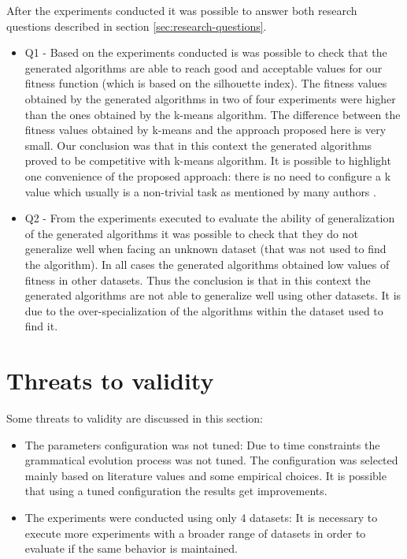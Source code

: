 \documentclass[journal]{IEEEtran}
\begin{document}
After the experiments conducted it was possible to answer both research questions described in section \ref{sec:research-questions}.
\begin{itemize}
	\item Q1 - Based on the experiments conducted is was possible to check that the generated algorithms are able to reach good and acceptable values for our fitness function (which is based on the silhouette index). The fitness values obtained by the generated algorithms in two of four experiments were higher than the ones obtained by the k-means algorithm. The difference between the fitness values obtained by k-means and the approach proposed here is very small. Our conclusion was that in this context the generated algorithms proved to be competitive with k-means algorithm. It is possible to highlight one convenience of the proposed approach: there is no need to configure a k value which usually is a non-trivial task as mentioned by many authors \cite{pham2005selection, yan2005methods, tibshirani2001estimating}.
	\item Q2 - From the experiments executed to evaluate the ability of generalization of the generated algorithms it was possible to check that they do not generalize well when facing an unknown dataset (that was not used to find the algorithm). In all cases the generated algorithms obtained low values of fitness in other datasets. Thus the conclusion is that in this context the generated algorithms are not able to generalize well using other datasets. It is due to the over-specialization of the algorithms within the dataset used to find it.
\end{itemize}

\section{Threats to validity} \label{sec:threats}

Some threats to validity are discussed in this section:
\begin{itemize}
	\item The parameters configuration was not tuned: Due to time constraints the grammatical evolution process was not tuned. The configuration was selected mainly based on literature values and some empirical choices. It is possible that using a tuned configuration the results get improvements.
	\item The experiments were conducted using only 4 datasets: It is necessary to execute more experiments with a broader range of datasets in order to evaluate if the same behavior is maintained.
\end{itemize}




\end{document}
